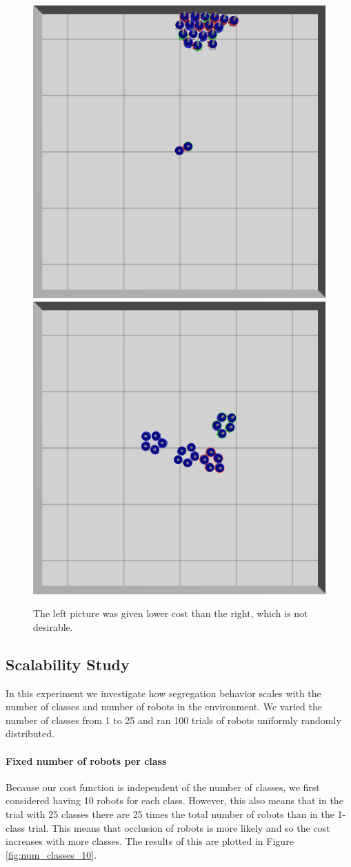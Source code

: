 \documentclass[conference]{IEEEtran}
\begin{document}
    \begin{figure}[H]
      \centering
      \includegraphics[width=0.49\linewidth]{./images/individual_0_gen_0.png}
      \includegraphics[width=0.49\linewidth]{./images/individual_0_gen_1_better.png}
      \caption{The left picture was given lower cost than the right, which is not desirable.}
      \label{fig:cost_function_fuckup}
    \end{figure}

  \subsection{Scalability Study} \label{section:scalability}

    In this experiment we investigate how segregation behavior scales with the number of classes and number of robots in the environment. We varied the number of classes from 1 to 25 and ran 100 trials of robots uniformly randomly distributed.

    \paragraph{Fixed number of robots per class}

    Because our cost function is independent of the number of classes, we first considered having 10 robots for each class. However, this also means that in the trial with 25 classes there are 25 times the total number of robots than in the 1-class trial. This means that occlusion of robots is more likely and so the cost increases with more classes. The results of this are plotted in Figure  \ref{fig:num_classes_10}.
\end{document}
